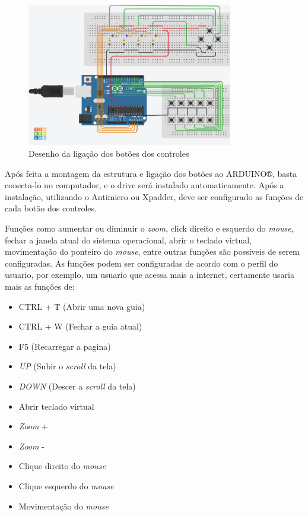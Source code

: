 \documentclass[
	12pt,			%
	openright,		%
	oneside,			%
	a4paper,			%
	chapter=TITLE,		%
	english,			%
	brazil,			%
	]{abntex2}
\begin{document}
\begin{figure}[H]
	\centering
		\includegraphics[width=0.8\textwidth]{./img/img-19.png}
		\caption{Desenho da ligação dos botões dos controles}
		\label{img:img-19}
\end{figure}

Após feita a montagem da estrutura e ligação dos botões ao ARDUINO®, basta conecta-lo no computador, e o drive será instalado automaticamente. Após a instalação, utilizando o Antimicro ou Xpadder, deve ser configurado as funções de cada botão dos controles.

Funções como aumentar ou diminuir o \emph{zoom}, click direito e esquerdo do \emph{mouse}, fechar a janela atual do sistema operacional, abrir o teclado virtual, movimentação do ponteiro do \emph{mouse}, entre outras funções são possíveis de serem configuradas.
As funções podem ser configuradas de acordo com o perfil do usuario, por exemplo, um usuario que acessa mais a internet, certamente usaria mais as funções de:

\begin{itemize}
\item CTRL + T (Abrir uma nova guia)
\item CTRL + W (Fechar a guia atual)
\item F5 (Recarregar a pagina)
\item \emph{UP} (Subir o \emph{scroll} da tela)
\item \emph{DOWN} (Descer a \emph{scroll} da tela)
\item Abrir teclado virtual
\item \emph{Zoom} +
\item \emph{Zoom} -
\item Clique direito do \emph{mouse}
\item Clique esquerdo do \emph{mouse}
\item Movimentação do \emph{mouse}
\end{itemize}
\end{document}
